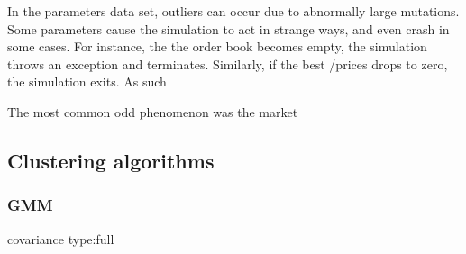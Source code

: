 In the parameters data set, outliers can occur due to abnormally large mutations. 
Some parameters cause the simulation to act in strange ways, and even crash in some cases. For instance, the the order book becomes empty, the simulation throws an exception and terminates. Similarly, if the best \bid/\ask prices drops to zero, the simulation exits. As such 

The most common odd phenomenon was the market 




\subsection{Clustering algorithms}
\subsubsection{GMM}
covariance type:full
